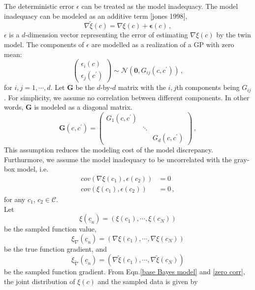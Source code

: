 \documentclass[a4paper,onecolumn]{article}
\theoremstyle{remark}
\begin{document}
The deterministic error $\epsilon$ can be treated as the model inadequacy.
The model inadequacy can be modeled as an additive term [jones 1998],
\begin{equation}
    \nabla \tilde{\xi}(c) = \nabla \xi(c) + \mathbf{\epsilon}(c)\,,
    \label{base Bayes model}
\end{equation}
$\epsilon$ is a $d$-dimension vector representing the 
error of estimating $\nabla \xi(c)$ by the twin model.
The components of $\epsilon$ are modelled as a realization of a GP with zero mean:
\begin{equation}
    \begin{pmatrix}
        \epsilon_i(c)\\
        \epsilon_j(c^\prime)
    \end{pmatrix} \sim \mathcal{N}\left( \textbf{0}, G_{ij}(c,c^\prime) \right)\,,
    \label{GP noise}
\end{equation}
for $i,j=1,\cdots, d$. Let $\mathbf{G}$ be the $d$-by-$d$ matrix with the $i,j$th components 
being $G_{ij}$.
For simplicity, we assume no correlation between different components. In other words,
$\mathbf{G}$ is modeled as a diagonal matrix. 
\begin{equation}
    \mathbf{G}(c,c^\prime) = 
    \begin{pmatrix}
        G_1(c,c^\prime) & &\\
        & \ddots & \\
        & & G_d(c,c^\prime)
    \end{pmatrix}\,,
    \label{error independence}
\end{equation}
This assumption reduces the modeling cost of the model discrepancy.\\

Furthurmore, we assume the model inadequacy to be uncorrelated with the gray-box model, i.e.
\begin{equation}\begin{split}
    cov(\nabla \xi(c_1), \epsilon(c_2)) &= 0\\
    cov(\xi(c_1), \epsilon(c_2)) &= 0\,,
    \label{zero corr}
\end{split}\end{equation}
for any $c_1$, $c_2 \in \mathcal{C}$.\\

\indent Let
\begin{equation}
    \xi(\underline{c}_n)=\left(\xi(c_1), \cdots, \xi(c_N)\right)
\end{equation}
be the sampled function value,
\begin{equation}
    \xi_\nabla(\underline{c}_n) = \left(\nabla {\xi}(c_1) ,\cdots, \nabla {\xi}(c_N)\right)
\end{equation}
be the true function gradient, and
\begin{equation}
    \xi_{\tilde{\nabla}}(\underline{c}_n) = \left(\nabla \tilde {\xi}(c_1) ,\cdots, \nabla \tilde {\xi}(c_N)\right)
\end{equation}
be the sampled function gradient.
From Eqn.\eqref{base Bayes model} and \eqref{zero corr}, the joint distribution
of $\xi(c)$ and the sampled data
is given by 
\end{document}
